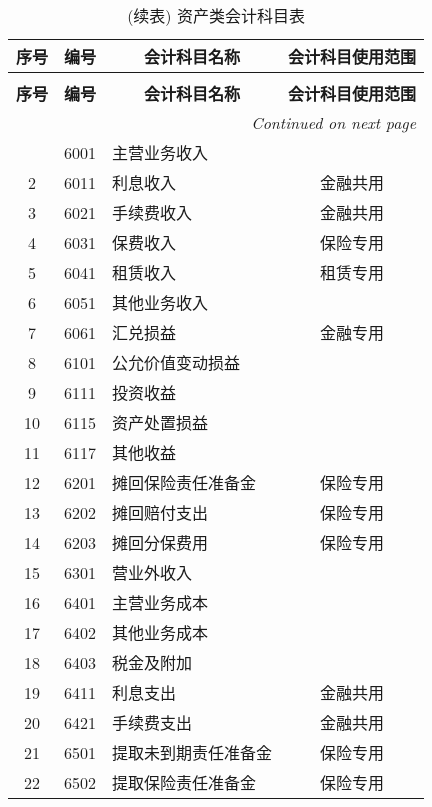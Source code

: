 \documentclass[a4paper]{ctexart}    %
\begin{document}
\begin{center}
    \begin{longtable}{|c|c|p{6cm}|c|}
\caption{损益类会计科目表}\\
\hline
\textbf{序号} & \textbf{编号} & \multicolumn{1}{c|}{\textbf{会计科目名称}} & \textbf{会计科目使用范围} \\
\hline \hline
\endfirsthead
\caption{(续表) 资产类会计科目表}\\
\hline
\textbf{序号} & \textbf{编号} & \multicolumn{1}{c|}{\textbf{会计科目名称}} & \textbf{会计科目使用范围} \\
\hline \hline
\endhead
\hline
\multicolumn{4}{|r|}{\textit{Continued on next page}} \\\hline
\endfoot
\hline
\endlastfoot
1 & 6001 & 主营业务收入 & \\\hline
2 & 6011 & 利息收入 & 金融共用 \\\hline
3 & 6021 & 手续费收入 & 金融共用 \\\hline
4 & 6031 & 保费收入 & 保险专用 \\\hline
5 & 6041 & 租赁收入 & 租赁专用 \\\hline
6 & 6051 & 其他业务收入 & \\\hline
7 & 6061 & 汇兑损益 & 金融专用 \\\hline
8 & 6101 & 公允价值变动损益 &  \\\hline
9 & 6111 & 投资收益 & \\\hline
10 & 6115 & 资产处置损益 & \\\hline
11 & 6117 & 其他收益 & \\\hline
12 & 6201 & 摊回保险责任准备金 & 保险专用 \\\hline
13 & 6202 & 摊回赔付支出 & 保险专用 \\\hline
14 & 6203 & 摊回分保费用 & 保险专用 \\\hline
15 & 6301 & 营业外收入 & \\\hline
16 & 6401 & 主营业务成本 & \\\hline
17 & 6402 & 其他业务成本 & \\\hline
18 & 6403 & 税金及附加 & \\\hline
19 & 6411 & 利息支出 & 金融共用 \\\hline
20 & 6421 & 手续费支出 & 金融共用 \\\hline
21 & 6501 & 提取未到期责任准备金 & 保险专用 \\\hline
22 & 6502 & 提取保险责任准备金 & 保险专用 \\\hline

\end{longtable}
\end{center}
\end{document}
